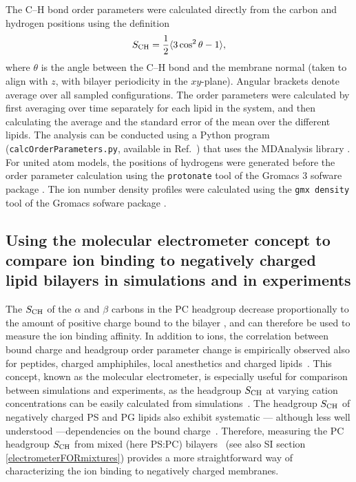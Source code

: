 \documentclass[journal=jpcbfk,manuscript=article]{achemso}
\begin{document}



The C--H bond order parameters were calculated directly
from the carbon and hydrogen positions using the definition
\begin{equation}
S_{\rm CH}=\frac{1}{2}\langle 3\cos^2\theta -1 \rangle,
\end{equation}
where $\theta$ is the angle between the C--H bond and the membrane normal
(taken to align with $z$, with bilayer periodicity in the $xy$-plane).
Angular brackets denote average over all sampled configurations.
The order parameters were calculated by first averaging over time separately
for each lipid in the system, and then calculating the average and
the standard error of the mean over the different lipids. The analysis can be conducted using a
Python program ({\tt calcOrderParameters.py}, available in Ref.~) that uses the
MDAnalysis library \cite{agrawal11,gowers16}.
For united atom models, the positions of hydrogens were generated before the order parameter calculation using the {\tt protonate} tool
of the Gromacs 3 sofware package \cite{gromacsMANUAL}.
The ion number density profiles were calculated using the {\tt gmx density} tool
of the Gromacs sofware package \cite{gromacsMANUAL}.

\subsection{Using the molecular electrometer concept to compare ion binding to negatively charged lipid bilayers 
in simulations and in experiments}

The $S_{\rm CH}$ of the $\alpha$ and $\beta$ carbons in the PC headgroup
decrease proportionally to the amount of positive
charge bound to the bilayer \cite{akutsu81,altenbach84,seelig87},
and can therefore be used to measure the ion binding affinity.
In addition to ions, the correlation between bound charge and headgroup order parameter change
is empirically observed also for peptides, charged amphiphiles, local anesthetics and charged lipids~\cite{scherer87,beschiaschvili91}.
This concept, known as the molecular electrometer, is especially useful for 
comparison between simulations and experiments, as
the headgroup $S_{\rm CH}$ at varying cation
concentrations can be easily calculated from
simulations~\cite{catte16}. The headgroup $S_{\rm CH}$
of negatively charged PS and PG lipids also exhibit systematic --- although less well understood ---dependencies on the bound charge~\cite{borle85,macdonald87,roux86,roux90}.
Therefore, measuring the PC headgroup $S_{\rm CH}$ from 
mixed (here PS:PC) bilayers~\cite{roux86,roux90,roux91} (see also SI section \ref{electrometerFORmixtures}) provides a more straightforward way of characterizing the ion binding to negatively charged membranes.
\end{document}
